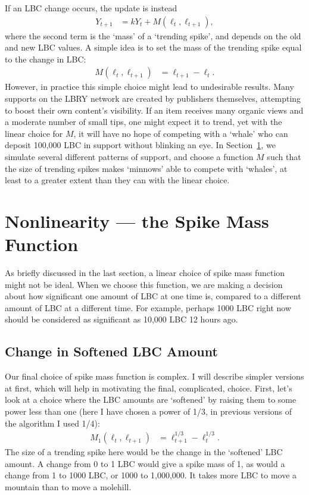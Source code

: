\documentclass[a4paper, 12pt]{article}
\begin{document}
If an LBC change occurs, the update is instead
\begin{align}
Y_{t+1} &= kY_t + M(\ell_t, \ell_{t+1}), \label{eqn:decay_with_spike}
\end{align}
where the second term is the `mass' of a `trending spike', and depends on
the old and new LBC values. A simple idea is to set the mass of the trending
spike equal to the change in LBC:
\begin{align}
M(\ell_t, \ell_{t+1}) &= \ell_{t+1} - \ell_t.
\end{align}
However, in practice this simple choice might lead to undesirable results.
Many supports on the LBRY network are created by publishers themselves,
attempting to boost their own content's visibility. If an item receives
many organic views and a moderate number of small tips, one might expect it
to trend, yet with the linear choice for $M$, it will have no hope of
competing with a `whale' who can deposit 100,000 LBC in support without
blinking an eye. In Section~\ref{sec:spike_mass}, we simulate several
different patterns of support, and choose a function $M$ such that
the size of trending spikes makes `minnows' able to compete with `whales',
at least to a greater extent than they can with the linear choice.

\section{Nonlinearity --- the Spike Mass Function}\label{sec:spike_mass}
As briefly discussed in the last section, a linear choice of spike mass
function might not be ideal. When we choose this function, we are making
a decision about how significant one amount of LBC at one time is, compared
to a different amount of LBC at a different time. For example, perhaps
1000 LBC right now should be considered as
significant as 10,000 LBC 12 hours ago.

\subsection{Change in Softened LBC Amount}
Our final choice of spike mass function is complex. I will describe simpler
versions at first, which will help in motivating the final, complicated, choice.
First, let's look at a choice where the LBC amounts are `softened' by raising
them to some power less than one (here I have chosen a power of 1/3, in
previous versions of the algorithm I used 1/4):
\begin{align}
M_1(\ell_t, \ell_{t+1}) &= \ell_{t+1}^{1/3} - \ell_t^{1/3}.
\end{align}
The size of a trending spike here would be the change in the `softened'
LBC amount. A change from 0 to 1 LBC would give a spike mass of 1,
as would a change from 1 to 1000 LBC, or 1000 to 1,000,000. It takes more
LBC to move a mountain than to move a molehill.
\end{document}
